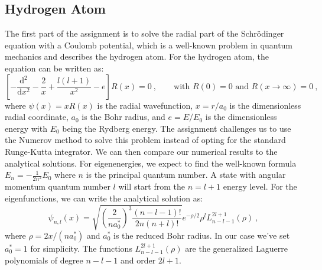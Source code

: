\documentclass[10pt, titlepage, a4paper]{article}
\newcommand{\dd}{\mathrm{d}}
\begin{document}
\subsection{Hydrogen Atom}
The first part of the assignment is to solve the radial part of the Schrödinger equation with a Coulomb potential, which is a well-known problem in quantum mechanics and 
describes the hydrogen atom. For the hydrogen atom, the equation can be written as:
%
\begin{equation}
    \left[-\frac{\dd^2}{\dd x^2}-\frac{2}{x} + \frac{l(l+1)}{x^2}- e\right] R(x) = 0\>,\qquad \text{with } R(0) = 0 \text{ and } R(x\to\infty) = 0\>,
\end{equation}
%
where $\psi(x) = x R(x)$ is the radial wavefunction, $x = r/a_0$ is the dimensionless radial coordinate, $a_0$ is the Bohr radius, and $e = E/E_0$ is the dimensionless
energy with $E_0$ being the Rydberg energy. The assignment challenges us to use the Numerov method to solve this problem instead of opting for the standard Runge-Kutta integrator.
We can then compare our numerical results to the analytical solutions. For eigenenergies, we expect to find the well-known formula $E_n = -\frac{1}{2n^2} E_0$ where $n$ is the principal quantum number. 
A state with angular momentum quantum number $l$ will start from the $n = l + 1$ energy level. For the eigenfunctions, we can write the analytical solution as:
%
\begin{equation}
    \psi_{n,l}(x) = \sqrt{\left(\frac{2}{na^*_0}\right)^3\frac{(n-l-1)!}{2n(n+l)!}} e^{-\rho/2} \rho^l L_{n-l-1}^{2l+1}(\rho)\>,
    \label{eq:hydrogen-ana}
\end{equation}
%
where $\rho = 2x/(na^*_0)$ and $a^*_0$ is the reduced Bohr radius. In our case we've set $a^*_0 = 1$ for simplicity. The functions $L_{n-l-1}^{2l+1}(\rho)$ are the
generalized Laguerre polynomials of degree $n-l-1$ and order $2l+1$.
\end{document}
